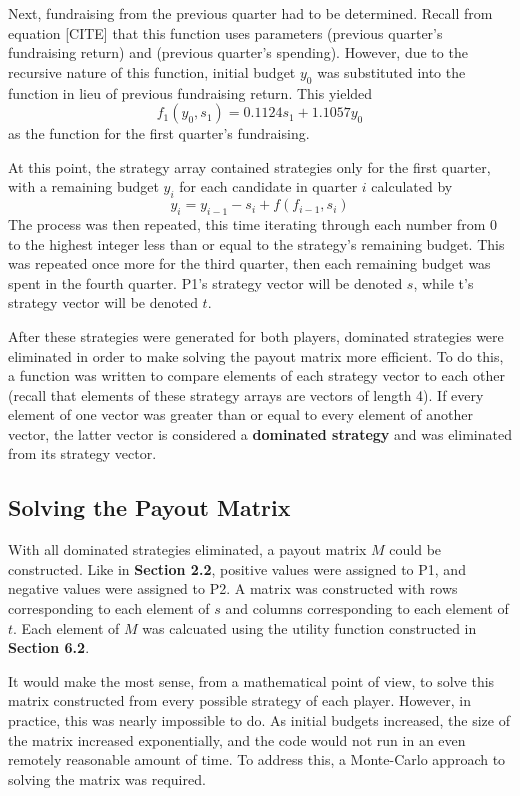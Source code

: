\documentclass[11pt]{article}
\begin{document}
Next, fundraising from the previous quarter had to be determined. Recall from
equation [CITE] that this function uses parameters (previous quarter's
fundraising return) and (previous quarter's spending). However, due to the
recursive nature of this function, initial budget $y_0$ was substituted into
the function in lieu of previous fundraising return. This yielded
\begin{equation*}
f_1(y_0, s_1) = 0.1124s_1 + 1.1057y_0
\end{equation*}
as the function for the first quarter's fundraising.

At this point, the strategy array contained strategies only for the first
quarter, with a remaining budget $y_i$ for each candidate in quarter $i$
calculated by
\begin{equation*}
y_i = y_{i-1} - s_i + f(f_{i-1}, s_i)
\end{equation*}
The process was then repeated, this time iterating through each number from 0
to the highest integer less than or equal to the strategy's remaining
budget. This was repeated once more for the third quarter, then each remaining
budget was spent in the fourth quarter. P1's strategy vector will be denoted
$s$, while t's strategy vector will be denoted $t$.

After these strategies were generated for both players, dominated strategies
were eliminated in order to make solving the payout matrix more efficient. To
do this, a function was written to compare elements of each strategy vector to
each other (recall that elements of these strategy arrays are vectors of length
4). If every element of one vector was greater than or equal to every element
of another vector, the latter vector is considered a \textbf{dominated
strategy} and was eliminated from its strategy vector.
\subsection{Solving the Payout Matrix}
With all dominated strategies eliminated, a payout matrix $M$ could be
constructed. Like in \textbf{Section 2.2}, positive values were assigned to P1,
and negative values were assigned to P2. A matrix was constructed with rows
corresponding to each element of $s$ and columns corresponding to each element
of $t$. Each element of $M$ was calcuated using the utility function
constructed in \textbf{Section 6.2}.

It would make the most sense, from a mathematical point of view, to solve this
matrix constructed from every possible strategy of each player. However, in
practice, this was nearly impossible to do. As initial budgets increased, the
size of the matrix increased exponentially, and the code would not run in an
even remotely reasonable amount of time. To address this, a Monte-Carlo
approach to solving the matrix was required.
\end{document}
